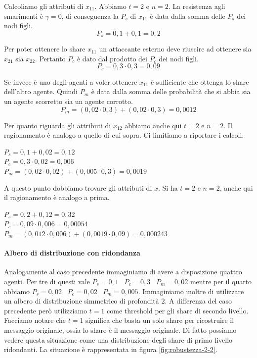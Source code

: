 Calcoliamo gli attributi di $ x_{11} $. Abbiamo $ t = 2 $ e $ n = 2 $.
La resistenza agli smarimenti è $ \gamma = 0 $,
di conseguenza la $ P_s $ di $ x_{11} $ è data dalla somma delle $ P_s $ dei nodi figli.
$$ P_s = 0,1 + 0,1 = 0,2 $$

Per poter ottenere lo share $ x_{11} $ un attaccante esterno deve riuscire ad ottenere
sia $ x_{21} $ sia $ x_{22} $. Pertanto $ P_c $ è dato dal prodotto dei $ P_c $ dei nodi figli.
$$ P_c = 0,3 \cdot 0,3 = 0,09 $$

Se invece è uno degli agenti a voler ottenere $ x_{11} $  è sufficiente che ottenga
lo share dell'altro agente. Quindi $ P_m $ è data dalla somma delle probabilità
che si abbia sia un agente scorretto sia un agente corrotto.
$$ P_m = (0,02 \cdot 0,3) + (0,02 \cdot 0,3) = 0,0012 $$

Per quanto riguarda gli attributi di $ x_{12} $ abbiamo anche qui $ t = 2 $ e $ n = 2 $.
Il ragionamento è analogo a quello di cui sopra. Ci limitiamo
a riportare i calcoli.
\begin{tightcenter}
	$ P_s = 0,1 + 0,02 = 0,12 $      \\
	$ P_c = 0,3 \cdot 0,02 = 0,006 $ \\
	$ P_m = (0,02 \cdot 0,02) + (0,005 \cdot 0,3) = 0,0019 $
\end{tightcenter}
A questo punto dobbiamo trovare gli attributi di $ x $.
Si ha $ t = 2 $ e $ n = 2 $, anche qui il ragionamento è analogo a prima.
\begin{tightcenter}
	$ P_s = 0,2 + 0,12 = 0,32 $\\
	$ P_c = 0,09 \cdot 0,006 = 0,00054 $\\
	$ P_m = (0,012 \cdot 0,006) + (0,0019 \cdot 0,09) = 0,000243 $
\end{tightcenter}

\paragraph{Albero di distribuzione con ridondanza}
Analogamente al caso precedente immaginiamo di avere a disposizione quattro agenti. Per tre di questi
vale
$ P_s = 0,1 $ \,
$ P_c = 0,3 $ \,
$ P_m = 0,02 $
mentre per il quarto abbiamo
$ P_s = 0,02 $ \,
$ P_c = 0,02 $ \,
$ P_m = 0,005 $.
Immaginiamo inoltre di utilizzare un albero di distribuzione simmetrico di profondità 2.
A differenza del caso precedente però utilizziamo $ t = 1 $ come threshold per gli share di secondo livello.
Facciamo notare che $ t = 1 $ significa che basta un solo share per ricostruire il messaggio originale,
ossia lo share è il messaggio originale. Di fatto possiamo vedere questa situazione come una
distribuzione degli share di primo livello ridondanti.
La situazione è rappresentata in figura \ref{fig:robustezza-2-2}.

